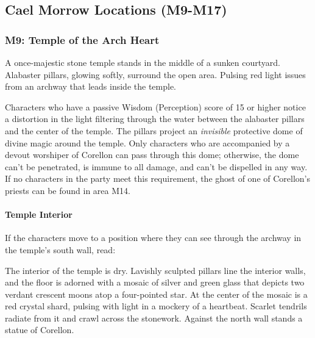 \documentclass[a4paper, 11pt, bg=full, twocolumn, nooutline]{dndbook}
\begin{document}
\subsection{Cael Morrow Locations (M9-M17)}


\subsubsection{M9: Temple of the Arch Heart}

\begin{DndReadAloud}
A once-majestic stone temple stands in the middle of a sunken courtyard. Alabaster pillars, glowing softly, surround the open area. Pulsing red light issues from an archway that leads inside the temple.
\end{DndReadAloud}

Characters who have a passive Wisdom (Perception) score of 15 or higher notice a distortion in the light filtering through the water between the alabaster pillars and the center of the temple. The pillars project an \textit{invisible} protective dome of divine magic around the temple. Only characters who are accompanied by a devout worshiper of Corellon can pass through this dome; otherwise, the dome can't be penetrated, is immune to all damage, and can't be dispelled in any way. If no characters in the party meet this requirement, the ghost of one of Corellon's priests can be found in area M14.

\paragraph{Temple Interior}

If the characters move to a position where they can see through the archway in the temple's south wall, read:

\begin{DndReadAloud}
The interior of the temple is dry. Lavishly sculpted pillars line the interior walls, and the floor is adorned with a mosaic of silver and green glass that depicts two verdant crescent moons atop a four-pointed star. At the center of the mosaic is a red crystal shard, pulsing with light in a mockery of a heartbeat. Scarlet tendrils radiate from it and crawl across the stonework. Against the north wall stands a statue of Corellon.
\end{DndReadAloud}
\end{document}
